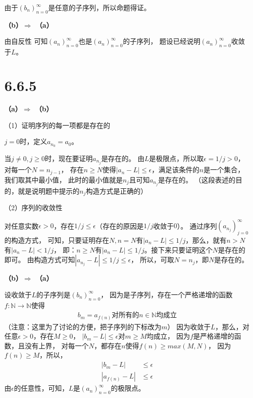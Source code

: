 \documentclass{article}
\theoremstyle{mystyle}
\begin{document}
由于$(b_n)_{n=0}^\infty$是任意的子序列，所以命题得证。

\textbf{（b）$\Rightarrow$ （a）}

由自反性 可知$(a_n)_{n=0}^\infty$也是$(a_n)_{n=0}^\infty$的子序列，
题设已经说明$(a_n)_{n=0}^\infty$收敛于$L$。

\section*{6.6.5}

\textbf{（a）$\Rightarrow$ （b）}

（1）证明序列的每一项都是存在的

$j=0$时，定义$a_{n_0}=a_0$。

当$j \neq 0, j \geq 0$时，现在要证明$a_{n_j}$是存在的。
由$L$是极限点，所以取$\epsilon = 1/j > 0$，对每一个$N=n_{j-1}$，
存在$n \geq N$使得$|a_n - L| \leq \epsilon$，满足该条件的$n$是一个集合，我们取其中最小值，
此时的最小值就是$n_j$且可知$a_{n_j}$是存在的。
（这段表述的目的，就是说明题中提示的$n_j$构造方式是正确的）

（2）序列的收敛性

对任意实数$\epsilon > 0$，存在$1/j \leq \epsilon$（存在的原因是$1/j$收敛于$0$）。
通过序列$(a_{n_j})_{j=0}^\infty$的构造方式，
可知，只要证明存在$N, n = N$有$|a_n - L| \leq 1/j$，那么，就有$n > N$有$|a_n - L| < 1/j$，
即：$n \geq N$有$|a_n - L| \leq 1/j$。接下来只要证明这个$N$是存在的即可。
由构造方式可知$|a_{n_j} - L | \leq 1/j \leq \epsilon$，
所以，可取$N = n_j$，即$N$是存在的。


\textbf{（b）$\Rightarrow$ （a）}

设收敛于$L$的子序列是$(b_n)_{n=0}^\infty$，
因为是子序列，存在一个严格递增的函数$f : \mathbb{N} \rightarrow \mathbb{N}$使得
\begin{align*}
  b_m = a_{f(n)} \text{对所有的$n \in \mathbb{N}$均成立}
\end{align*}
（注意：这里为了讨论的方便，把子序列的下标改为$m$）
因为收敛于$L$，那么，对任意$\epsilon > 0$，存在$M \geq 0$，
$|b_m - L| \leq \epsilon$对$m \geq M$均成立，
因为$f$是严格递增的函数，且没有上界，
对每一个$N$，都存在$n$使得$f(n) \geq max(M, N)$，
因为$f(n) \geq M$，所以，
\begin{align*}
  |b_m - L|      & \leq \epsilon \\
  |a_{f(n)} - L| & \leq \epsilon
\end{align*}
由$\epsilon$的任意性，可知，$L$是$(a_n)_{n=0}^\infty$的极限点。
\end{document}
